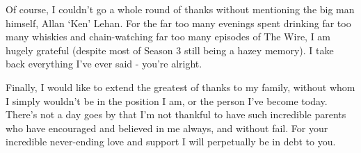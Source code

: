 \begin{acknowledgements}
\begin{spacing}{1}
Of course, I couldn't go a whole round of thanks without mentioning the big man
himself, Allan `Ken' Lehan. For the far too many evenings spent
drinking far too many whiskies and chain-watching far too many episodes of The
Wire, I am hugely grateful (despite most of Season 3 still being a hazey
memory). I take back everything I've ever said - you're alright.

Finally, I would like to extend the greatest of thanks to my family, without whom
I simply wouldn't be in the position I am, or the person I've become today.
There's not a day goes by that I'm not thankful to have such incredible parents
who have encouraged and believed in me always, and without fail.
For your incredible never-ending love and support I will perpetually be in debt
to you.
\end{spacing}

\end{acknowledgements}

